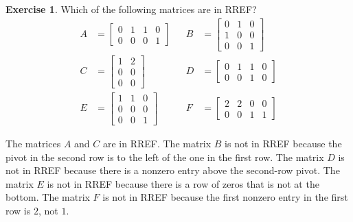 \documentclass[a4paper]{book}
\newcommand{\bbm}       {\begin{bmatrix}}
\newcommand{\ebm}       {\end{bmatrix}}
\renewcommand{\:}{\colon}
\theoremstyle{definition}
\newtheorem{exercise}[theorem]{Exercise}
\renewenvironment{solution}{\SolutionInline}{\endSolutionInline}
\begin{document}
\begin{exercise}
 Which of the following matrices are in RREF?
 {\small \[ \begin{array}{rlcrl}
  A &= \bbm 0&1&1&0 \\ 0&0&0&1 \ebm &&
  B &= \bbm 0&1&0 \\ 1&0&0 \\ 0&0&1 \ebm \\
  C &= \bbm 1&2\\0&0\\0&0 \ebm &&
  D &= \bbm 0&1&1&0\\0&0&1&0 \ebm \\
  E &= \bbm 1&1&0\\0&0&0\\0&0&1 \ebm &&
  F &= \bbm 2&2&0&0 \\ 0&0&1&1 \ebm 
 \end{array} \] }
\end{exercise}
\begin{solution}
 The matrices $A$ and $C$ are in RREF.  The matrix $B$ is not in RREF
 because the pivot in the second row is to the left of the one in the
 first row.  The matrix $D$ is not in RREF because there is a nonzero
 entry above the second-row pivot.  The matrix $E$ is not in RREF
 because there is a row of zeros that is not at the bottom.  The
 matrix $F$ is not in RREF because the first nonzero entry in the
 first row is $2$, not $1$. 
\end{solution}
\end{document}
